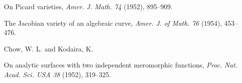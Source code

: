 {\noindent\hangindent=25bp\hspace*{6bp}%
On Picard varieties, \emph{Amer. J. Math. 74} (1952), 895--909.\par
\noindent\hangindent=25bp\hspace*{6bp}%
The Jacobian variety of an algebraic curve, \emph{Amer. J. of Math. 76} (1954), 453--476.\par
\par\vspace{2.15pt}\noindent \hypertarget{bib-474-19}{}Chow, W. L. and Kodaira, K.\par
\noindent\hangindent=25bp\hspace*{6bp}%
On analytic surfaces with two independent meromorphic functions, \emph{Proc. Nat. Acad. Sci. USA 38} (1952), 319--325.\par
}
